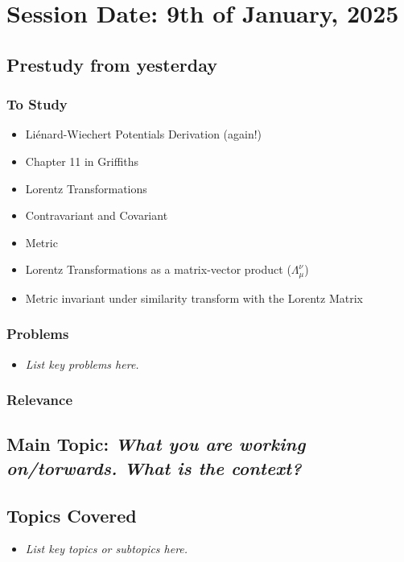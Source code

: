 \section{Session Date: 9th of January, 2025}
\subsection*{Prestudy from yesterday}
\subsubsection*{To Study}
\begin{itemize}
    \item Liénard-Wiechert Potentials Derivation (again!)
    \item Chapter 11 in Griffiths
    \item Lorentz Transformations
    \item Contravariant and Covariant
    \item Metric
    \item Lorentz Transformations as a matrix-vector product (\(\Lambda _\mu ^\nu\)) 
    \item Metric invariant under similarity transform with the Lorentz Matrix
\end{itemize}
\subsubsection*{Problems}
\begin{itemize}
    \item \textit{List key problems here.}
\end{itemize}

\subsubsection*{Relevance}

\subsection*{Main Topic: \textit{What you are working on/torwards. What is the context?}}
\subsection*{Topics Covered}
\begin{itemize}
    \item \textit{List key topics or subtopics here.} 
\end{itemize}

